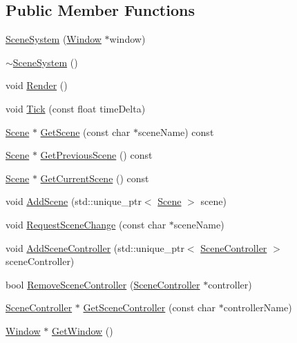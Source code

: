 \subsection*{Public Member Functions}
\begin{DoxyCompactItemize}
\item 
\mbox{\hyperlink{classngl_1_1_scene_system_a95860dbe4267edf52fa59c8606e9b35c}{Scene\+System}} (\mbox{\hyperlink{classngl_1_1_window}{Window}} $\ast$window)
\item 
\mbox{\hyperlink{classngl_1_1_scene_system_a6310af7c9c8223995b5bf2c771f459e4}{$\sim$\+Scene\+System}} ()
\item 
void \mbox{\hyperlink{classngl_1_1_scene_system_a30e02fe751cc8ef861460a843879e09d}{Render}} ()
\item 
void \mbox{\hyperlink{classngl_1_1_scene_system_aea13b1a75ea4c635ee61207df97f0635}{Tick}} (const float time\+Delta)
\item 
\mbox{\hyperlink{classngl_1_1_scene}{Scene}} $\ast$ \mbox{\hyperlink{classngl_1_1_scene_system_a6af397314087b88f0f46b6f9d09ffe87}{Get\+Scene}} (const char $\ast$scene\+Name) const
\item 
\mbox{\hyperlink{classngl_1_1_scene}{Scene}} $\ast$ \mbox{\hyperlink{classngl_1_1_scene_system_a8557a162247356925b470b6451df4bb3}{Get\+Previous\+Scene}} () const
\item 
\mbox{\hyperlink{classngl_1_1_scene}{Scene}} $\ast$ \mbox{\hyperlink{classngl_1_1_scene_system_a6c171f2b13aacbff3b158015c9eed94e}{Get\+Current\+Scene}} () const
\item 
void \mbox{\hyperlink{classngl_1_1_scene_system_ae3b08ac9812fdc43af044e6b8831688d}{Add\+Scene}} (std\+::unique\+\_\+ptr$<$ \mbox{\hyperlink{classngl_1_1_scene}{Scene}} $>$ scene)
\item 
void \mbox{\hyperlink{classngl_1_1_scene_system_a48b2f6c39b6bbf02ac5aec5c45bb20d8}{Request\+Scene\+Change}} (const char $\ast$scene\+Name)
\item 
void \mbox{\hyperlink{classngl_1_1_scene_system_a2f825af6f86a8db98dd57a15c812c083}{Add\+Scene\+Controller}} (std\+::unique\+\_\+ptr$<$ \mbox{\hyperlink{classngl_1_1_scene_controller}{Scene\+Controller}} $>$ scene\+Controller)
\item 
bool \mbox{\hyperlink{classngl_1_1_scene_system_a09a6a48b38e7da328520cc63854f16ea}{Remove\+Scene\+Controller}} (\mbox{\hyperlink{classngl_1_1_scene_controller}{Scene\+Controller}} $\ast$controller)
\item 
\mbox{\hyperlink{classngl_1_1_scene_controller}{Scene\+Controller}} $\ast$ \mbox{\hyperlink{classngl_1_1_scene_system_a92b4a89cd1afb9002cef4320a5a4d304}{Get\+Scene\+Controller}} (const char $\ast$controller\+Name)
\item 
\mbox{\hyperlink{classngl_1_1_window}{Window}} $\ast$ \mbox{\hyperlink{classngl_1_1_scene_system_a2af987ef6bc67cbc58f71e5b28acb141}{Get\+Window}} ()
\end{DoxyCompactItemize}


